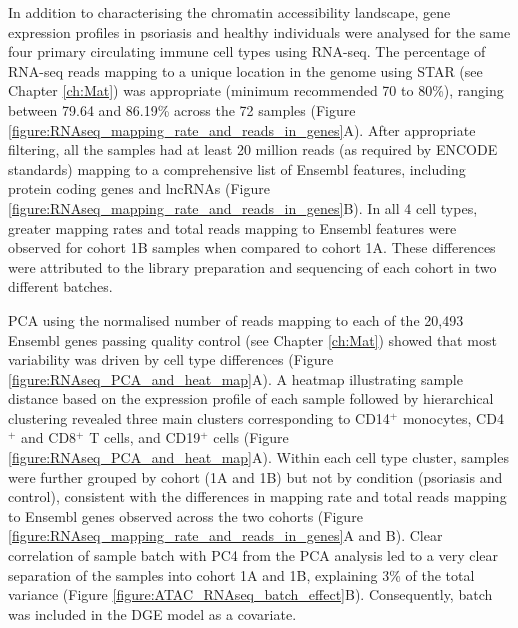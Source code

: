 In addition to characterising the chromatin accessibility landscape, gene expression profiles in psoriasis and healthy individuals were analysed for the same four primary circulating immune cell types using RNA-seq. The percentage of RNA-seq reads mapping to a unique location in the genome using STAR (see Chapter \ref{ch:Mat}) was appropriate (minimum recommended 70 to 80\%), ranging between 79.64 and 86.19\% across the 72 samples (Figure \ref{figure:RNAseq_mapping_rate_and_reads_in_genes}A). After appropriate filtering, all the samples had at least 20 million reads (as required by ENCODE standards) mapping to a comprehensive list of Ensembl features, including protein coding genes and lncRNAs (Figure \ref{figure:RNAseq_mapping_rate_and_reads_in_genes}B). %
In all 4 cell types, greater mapping rates and total reads mapping to Ensembl features were observed for cohort 1B samples when compared to cohort 1A. These differences were attributed to the library preparation and sequencing of each cohort in two different batches.  


PCA using the normalised number of reads mapping to each of the 20,493 Ensembl genes passing quality control (see Chapter \ref{ch:Mat}) showed that most variability was driven by cell type differences (Figure \ref{figure:RNAseq_PCA_and_heat_map}A). A heatmap illustrating sample distance based on the expression profile of each sample followed by hierarchical clustering revealed three main clusters corresponding to CD14$^+$ monocytes, CD4$^+$ and CD8$^+$ T cells, and CD19$^+$ cells (Figure \ref{figure:RNAseq_PCA_and_heat_map}A). Within each cell type cluster, samples were further grouped by cohort (1A and 1B) but not by condition (psoriasis and control), consistent with the differences in mapping rate and total reads mapping to Ensembl genes observed across the two cohorts (Figure \ref{figure:RNAseq_mapping_rate_and_reads_in_genes}A and B). Clear correlation of sample batch with PC4 from the PCA analysis led to a very clear separation of the samples into cohort 1A and 1B, explaining 3\% of the total variance (Figure \ref{figure:ATAC_RNAseq_batch_effect}B). Consequently, batch was included in the DGE model as a covariate.  

